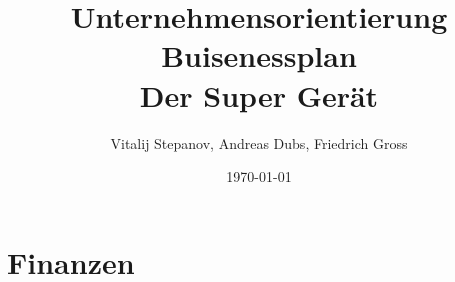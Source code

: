 \documentclass[12pt,a4paper]{scrartcl}
\begin{document}
\title{Unternehmensorientierung\\
	  Buisenessplan\\
	  Der Super Gerät}
\author{Vitalij Stepanov, Andreas Dubs, Friedrich Gross}
\date{\today}
\maketitle

\newpage
\pagestyle{myheadings}
 








\section{Finanzen}
%
\end{document}
